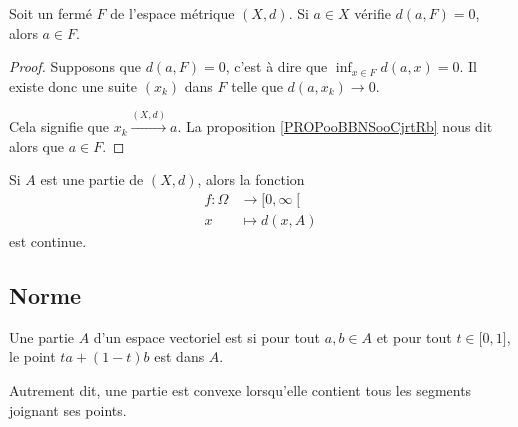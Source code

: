 \begin{lemma}        \label{LEMooEQIZooLpsbOe}
	Soit un fermé \( F\) de l'espace métrique \( (X,d)\). Si \( a\in X\) vérifie \( d(a,F)=0\), alors \( a\in F\).
\end{lemma}

\begin{proof}
	Supposons que \( d(a,F)=0\), c'est à dire que \( \inf_{x\in F} d(a,x) =0\). Il existe donc une suite \( (x_k)\) dans \( F\) telle que \( d(a,x_k)\to 0\).

	Cela signifie que \( x_k\stackrel{(X,d)}{\longrightarrow}a\). La proposition \ref{PROPooBBNSooCjrtRb} nous dit alors que \( a\in F\).
\end{proof}


\begin{lemma}        \label{LEMooCFGTooIfdcfk}
	Si \( A\) est une partie de \( (X,d)\), alors la fonction
	\begin{equation}
		\begin{aligned}
			f\colon \Omega & \to \mathopen[ 0 , \infty \mathclose[ \\
			x              & \mapsto d(x,A)
		\end{aligned}
	\end{equation}
	est continue.
\end{lemma}

\subsection{Norme}

\begin{definition}        \label{DEFooQQEOooAFKbcQ}
	Une partie \( A\) d'un espace vectoriel est  si pour tout \( a,b\in A\) et pour tout \( t\in \mathopen[ 0 , 1 \mathclose]\), le point \( ta+(1-t)b\) est dans \( A\).

	Autrement dit, une partie est convexe lorsqu'elle contient tous les segments joignant ses points.
\end{definition}

